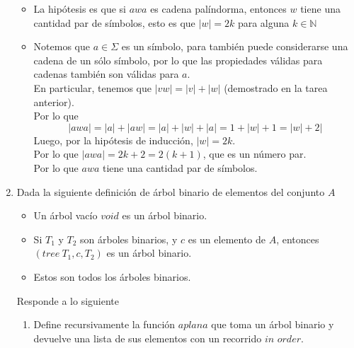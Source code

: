 \documentclass{article}
\begin{document}
\begin{enumerate}
{\begin{enumerate}
{\begin{itemize}
{                            Entonces $|w| = 0 = 2\cdot 0$.\\
                            Por lo que $w = \epsilon$ tiene una cantidad par de 
                            símbolos.
                        }
                        \item {
                            La hipótesis es que si $awa$ es cadena palíndorma, 
                            entonces $w$ tiene una cantidad par de símbolos, 
                            esto es que $|w| = 2k$ para alguna $k \in \mathbb{N}$
                        }
                        \item {
                            Notemos que $a \in \Sigma$ es un símbolo, para 
                            también puede considerarse una cadena de un sólo 
                            símbolo, por lo que las propiedades válidas para 
                            cadenas también son válidas para $a$.\\
                            En particular, tenemos que $|vw| = |v| + |w|$ 
                            (demostrado en la tarea anterior).\\
                            Por lo que
                            \[|awa| = |a| + |aw| = |a| + |w| + |a| = 1 + |w| + 1
                            = |w| + 2|\]
                            Luego, por la hipótesis de inducción, $|w| = 2k$.\\
                            Por lo que $|awa| = 2k + 2 = 2 (k+1)$, que es un 
                            número par.\\
                            Por lo que $awa$ tiene una cantidad par de símbolos.                        }
                    \end{itemize}
                }
                
            \end{enumerate}
        }
        \item {
            Dada la siguiente definición de árbol binario de elementos del 
            conjunto $A$
            \begin{itemize}
                \item {
                    Un árbol vacío $void$ es un árbol binario.
                }
                \item {
                    Si $T_1$ y $T_2$ son árboles binarios, y $c$ es un elemento 
                    de $A$, entonces $(tree \ T_1, c, T_2)$ es un árbol binario.
                }
                \item {
                    Estos son todos los árboles binarios.
                }
            \end{itemize}
            Responde a lo siguiente
            \begin{enumerate}
                \item {
                    Define recursivamente la función $aplana$ que toma
                    un árbol binario y devuelve una lista de sus elementos con 
                    un recorrido $\textit{in order}$.
		            
}
\end{enumerate}}
\end{enumerate}
\end{document}
